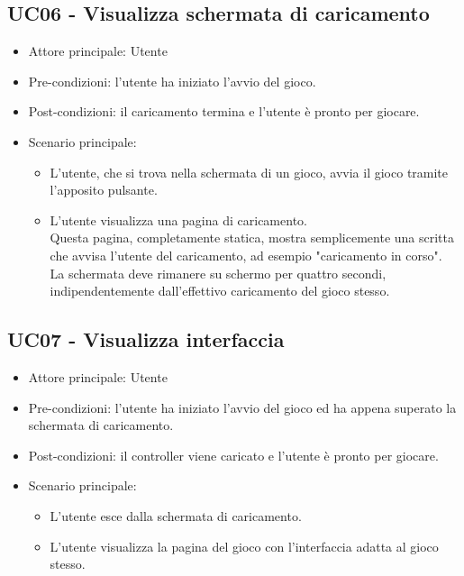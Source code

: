 \subsection{UC06 - Visualizza schermata di caricamento}
\begin{itemize}
    \item Attore principale: Utente
    \item Pre-condizioni: l'utente ha iniziato l'avvio del gioco.
    \item Post-condizioni: il caricamento termina e l'utente è pronto per giocare.
    \item Scenario principale: \begin{itemize}
        \item L'utente, che si trova nella schermata di un gioco, avvia il gioco tramite l'apposito pulsante.
        \item L'utente visualizza una pagina di caricamento.\\ Questa pagina, completamente statica, mostra semplicemente una scritta che avvisa l'utente del caricamento, ad esempio "caricamento in corso".\\ La schermata deve rimanere su schermo per quattro secondi, indipendentemente dall'effettivo caricamento del gioco stesso.
    \end{itemize}
\end{itemize}

\subsection{UC07 - Visualizza interfaccia}
\begin{itemize}
    \item Attore principale: Utente
    \item Pre-condizioni: l'utente ha iniziato l'avvio del gioco ed ha appena superato la schermata di caricamento.
    \item Post-condizioni: il controller viene caricato e l'utente è pronto per giocare.
    \item Scenario principale: \begin{itemize}
        \item L'utente esce dalla schermata di caricamento.
        \item L'utente visualizza la pagina del gioco con l'interfaccia adatta al gioco stesso.
    \end{itemize}
\end{itemize}

